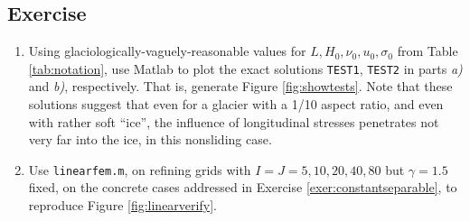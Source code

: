 \documentclass[11pt,final,reqno]{amsart}
\theoremstyle{remark}
\theoremstyle{definition}
\newcommand{\TESTONE}{\texttt{TEST1}\xspace}
\newcommand{\TESTTWO}{\texttt{TEST2}\xspace}
\begin{document}
\subsection{Exercise}
\begin{enumerate}
\item  Using glaciologically-vaguely-reasonable values for $L,H_0,\nu_0,u_0,\sigma_0$ from Table \ref{tab:notation}, use Matlab to plot the exact solutions \TESTONE, \TESTTWO in parts \emph{a)} and \emph{b)}, respectively.  That is, generate Figure \ref{fig:showtests}.  Note that these solutions suggest that even for a glacier with a 1/10 aspect ratio, and even with rather soft ``ice'', the influence of longitudinal stresses penetrates not very far into the ice, in this nonsliding case.
\item Use \texttt{linearfem.m}, on refining grids with  $I=J=5,10,20,40,80$ but $\gamma=1.5$ fixed, on the concrete cases addressed in Exercise \ref{exer:constantseparable}, to reproduce Figure \ref{fig:linearverify}.
\end{enumerate}
\end{document}
